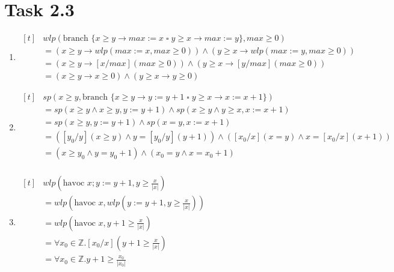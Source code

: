 \documentclass{article}
\newcommand{\Z}{\mathbb{Z}}
\begin{document}
	\section{Task 2.3}
	\begin{enumerate}[label = {(\alph*)}]
		
		\item
		$\begin{aligned}[t]
			&wlp(\text{branch } \{x \geq y \to max := x \; \square \; y \geq x \to max := y\}, max \geq 0) \\
			&= (x \geq y \to wlp(max := x, max \geq 0)) \land (y \geq x \to wlp(max := y, max \geq 0)) \\
			&= (x \geq y \to [x/max](max \geq 0)) \land (y \geq x \to [y/max](max \geq 0)) \\
			&= (x \geq y \to x \geq 0) \land (y \geq x \to y \geq 0)
		\end{aligned}$
		
		\item
		$\begin{aligned}[t]
			&sp(x \geq y, \text{branch } \{x \geq y \to y := y + 1 \; \square \; y \geq x \to x := x + 1\}) \\
			&= sp(x \geq y \land x \geq y, y := y + 1) \land sp(x \geq y \land y \geq x, x := x + 1) \\
			&= sp(x \geq y, y := y + 1) \land sp(x = y, x := x + 1) \\
			&= ([y_{0}/y](x \geq y) \land y = [y_{0}/y](y + 1)) \land ([x_{0}/x](x = y) \land x = [x_{0}/x](x + 1)) \\
			&= (x \geq y_{0} \land y = y_{0} + 1)  \land (x_{0} = y \land x = x_{0} + 1) \\
		\end{aligned}$
		
		\item
		$\begin{aligned}[t]
			&wlp(\text{havoc } x ; y := y + 1, y \geq \tfrac{x}{|x|}) \\
			&= wlp(\text{havoc } x, wlp(y := y + 1, y \geq \tfrac{x}{|x|})) \\
			&= wlp(\text{havoc } x, y + 1 \geq \tfrac{x}{|x|})\\
			&= \forall x_{0} \in \Z . [x_{0}/x](y + 1 \geq \tfrac{x}{|x|}) \\
			&= \forall x_{0} \in \Z . y + 1 \geq \tfrac{x_{0}}{|x_{0}|} \\
		\end{aligned}$
		
	\end{enumerate}
	
\end{document}
